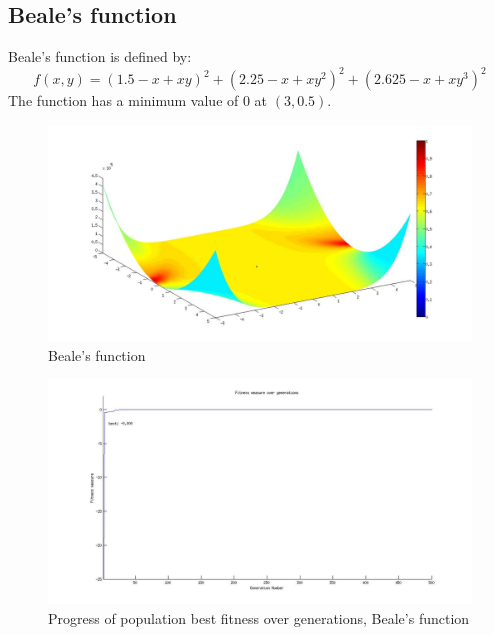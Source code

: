 \documentclass[ExampleMasters.tex]{subfiles}
\begin{document}
		\clearpage

		\subsection{Beale's function}

			Beale's function is defined by:
			\begin{equation}
				f(x,y) = (1.5-x+xy)^2+(2.25-x+xy^2)^2+(2.625-x+xy^3)^2
			\end{equation}
			The function has a minimum value of 0 at $(3,0.5)$.

			\begin{figure}[hb!]
				\centering
				\includegraphics[width=\textwidth]{figures/GeneticAlgorithm/Beale.jpg}
				\caption{Beale's function}
				\label{B1}
			\end{figure}

			\begin{figure}[hb!]
				\centering
				\includegraphics[width=\textwidth]{figures/GeneticAlgorithm/Beale_fitness_vs_generation.jpg}
				\caption{Progress of population best fitness over generations, Beale's function}
				\label{B1F}
			\end{figure}
\end{document}
